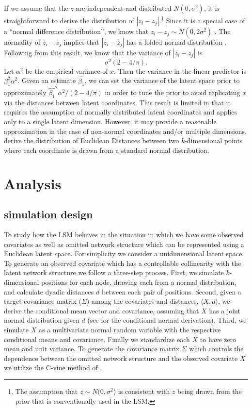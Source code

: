 \documentclass[12pt]{article}
\begin{document}
If we assume that the $z$ are independent and distributed $N(0,\sigma^2)$, it is straightforward to derive the distribution of $ |z_i - z_j|$.\footnote{The assumption that $z \sim N(0,\sigma^2$) is consistent with $z$ being drawn from the prior that is conventionally used in the LSM.} Since it is a special case of a ``normal difference distribution'', we know that $z_i - z_j \sim N(0,2\sigma^2)$ \citep{devore2012}. The normality of $z_i - z_j$ implies that $|z_i - z_j|$ has a folded normal distribution \citep{leone1961}. Following from this result, we know that the variance of  $|z_i - z_j|$ is $$\sigma^2(2-4/\pi). $$ Let $\alpha^2$ be the empirical variance of $x$. Then the variance in the linear predictor is $\beta_1^2\alpha^2$. Given an estimate $\hat{\beta_1}$, we can set the variance of the latent space prior to approximately $\hat{\beta_1}^2\alpha^2/(2-4/\pi)$ in order to tune the prior to avoid replicating $x$ via the distances between latent coordinates. This result is limited in that it requires the assumption of normally distributed latent coordinates and applies only to a single latent dimension. However, it may provide a reasonable approximation in the case of non-normal coordinates and/or multiple dimensions. \cite{thirey2015} derive the distribution of Euclidean Distances between two $k$-dimensional points where each coordinate is drawn from a standard normal distribution.

\section{Analysis}

\subsection{simulation design}

To study how the LSM behaves in the situation in which we have some observed covariates as well as omitted network structure which can be represented using a Euclidean latent space. For simplicity we consider a unidimensional latent space. To generate an observed covariate which has a controllable collinearity with the latent network structure we follow a three-step process. First, we simulate $k$-dimensional positions for each node, drawing each from a normal distribution, and calculate dyadic distances $d$ between each pair of positions. Second, given a target covariance matrix ($\Sigma$) among the covariates and distances, $\langle X,d \rangle$, we derive the conditional mean vector and covariance, assuming that $X$ has a joint normal distribution given $d$ (see \cite[pp. 116--117]{eaton1983} for the conditional normal derivation). Third, we simulate $X$ as a multivariate normal random variable with the respective conditional means and covariance. Finally we standardize each $X$ to have zero mean and unit variance. To generate the covariance matrix $\Sigma$ which controls the dependence between the omitted network structure and the observed covariate $X$ we utilize the C-vine method of \cite{lewandowski2009generating}. %
\end{document}
